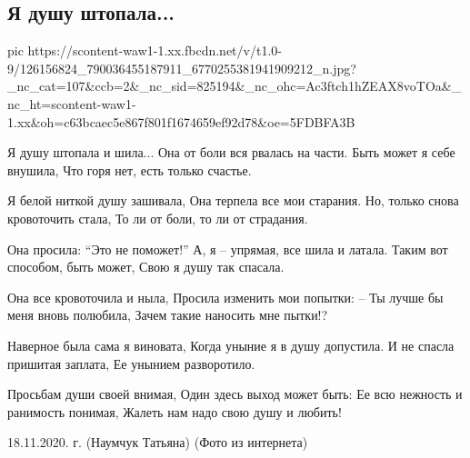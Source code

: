  
 
 

\subsection{Я душу штопала...}

\ifcmt
pic https://scontent-waw1-1.xx.fbcdn.net/v/t1.0-9/126156824_790036455187911_6770255381941909212_n.jpg?_nc_cat=107&ccb=2&_nc_sid=825194&_nc_ohc=Ac3ftch1hZEAX8voTOa&_nc_ht=scontent-waw1-1.xx&oh=c63bcaec5e867f801f1674659ef92d78&oe=5FDBFA3B
\fi

\obeycr
Я душу штопала и шила...
Она от боли вся рвалась на части.
Быть может я себе внушила,
Что горя нет, есть только счастье.

Я белой ниткой душу зашивала,
Она терпела все мои старания.
Но, только снова кровоточить стала,
То ли от боли, то ли от страдания.

Она просила: \enquote{Это не поможет!}
А, я -- упрямая, все шила и латала.
Таким вот способом, быть может,
Свою я душу  так спасала.

Она все кровоточила и ныла,
Просила изменить мои попытки:
-- Ты лучше бы меня вновь полюбила,
Зачем такие наносить мне пытки!?

Наверное была сама я виновата,
Когда уныние я в душу допустила.
И не спасла пришитая заплата,
Ее унынием разворотило.

Просьбам души своей внимая,
Один здесь выход может быть:
Ее всю нежность и ранимость понимая,
Жалеть нам надо свою душу и любить!

18.11.2020. г. (Наумчук Татьяна) 
(Фото из интернета)
\restorecr
